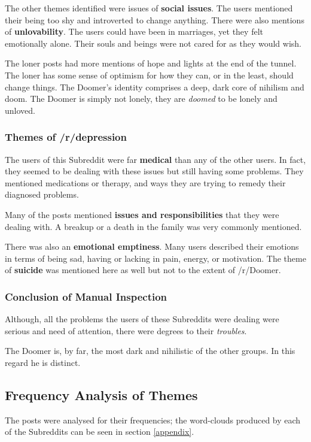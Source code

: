 \documentclass[../report.tex]{subfiles}
\begin{document}
The other themes identified were issues of \textbf{social issues}. The users mentioned their being too shy and introverted to change anything. 
There were also mentions of \textbf{unlovability}.
The users could have been in marriages, yet they felt emotionally alone.
Their souls and beings were not cared for as they would wish.

The loner posts had more mentions of hope and lights at the end of the tunnel. 
The loner has some sense of optimism for how they can, or in the least, should change things.
The Doomer's identity comprises a deep, dark core of nihilism and doom.
The Doomer is simply not lonely, they are \textit{doomed} to be lonely and unloved. 

\subsubsection{Themes of /r/depression}
The users of this Subreddit were far \textbf{medical} than any of the other users. 
In fact, they seemed to be dealing with these issues but still having some problems. 
They mentioned medications or therapy, and ways they are trying to remedy their diagnosed problems. 

Many of the posts mentioned \textbf{issues and responsibilities} that they were dealing with.
A breakup or a death in the family was very commonly mentioned. 

There was also an \textbf{emotional emptiness}. Many users described their emotions in terms of being sad, having or lacking in pain, energy, or motivation. 
The theme of \textbf{suicide} was mentioned here as well but not to the extent of /r/Doomer.

\subsubsection{Conclusion of Manual Inspection}
Although, all the problems the users of these Subreddits were dealing were serious and need of attention, there were degrees to their \textit{troubles}.

The Doomer is, by far, the most dark and nihilistic of the other groups. In this regard he is distinct. 

\subsection{Frequency Analysis of Themes}
The posts were analysed for their frequencies; the word-clouds produced by each of the Subreddits can be seen in section \ref{appendix}.
\end{document}

